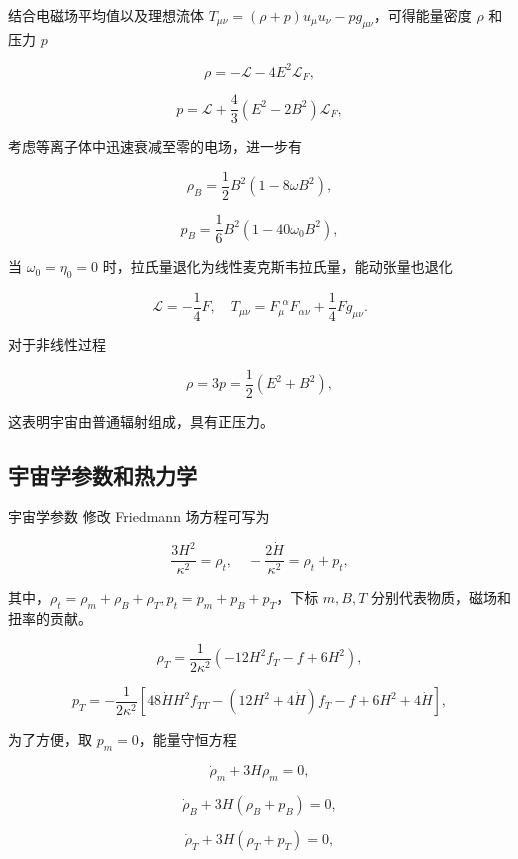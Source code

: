 \documentclass[9pt, dvipsnames]{beamer} %
\begin{document}
\begin{frame}
    结合电磁场平均值以及理想流体 $T_{\mu\nu}=(\rho+p)u_\mu u_\nu-p g_{\mu\nu}$，可得能量密度 $\rho$ 和压力 $p$

    $$
    \rho = -\mathcal{L} - 4E^2 \mathcal{L}_F,
    $$

    $$
    p = \mathcal{L} + \frac{4 }{3 } \left(E^2-2B^2 \right)\mathcal{L}_F,
    $$

    考虑等离子体中迅速衰减至零的电场，进一步有

    $$
    \rho_B = \frac{1 }{2 } B^2\left(1-8\omega B^2 \right),
    $$


    $$
    p_B = \frac{1 }{6 } B^2 \left(1-40\omega_0 B^2 \right),
    $$

    当 $\omega_0=\eta_0=0$ 时，拉氏量退化为线性麦克斯韦拉氏量，能动张量也退化

    $$
    \mathcal{L} = -\frac{1 }{4 } F,\quad
    T_{\mu\nu} = F_\mu^{~~\alpha} F_{\alpha\nu} + \frac{1 }{4 } F g_{\mu\nu}.
    $$

    对于非线性过程

    $$
    \rho = 3p = \frac{1 }{2 } \left(E^2 + B^2 \right),
    $$

    这表明宇宙由普通辐射组成，具有正压力。

\end{frame}

\subsection{宇宙学参数和热力学}

\begin{frame}{宇宙学参数}
    修改 Friedmann 场方程可写为

    $$
    \frac{3 H^2 }{\kappa^2 } = \rho_t,\quad
    -\frac{2\dot{H} }{\kappa^2 }  = \rho_t + p_t,
    $$
    
    其中，$\rho_t=\rho_m+\rho_B+\rho_T,p_t=p_m+p_B+p_T$，下标 $m,B,T$ 分别代表物质，磁场和扭率的贡献。

    $$
    \rho_T = \frac{1 }{2\kappa^2 } \left(-12 H^2 f_T - f + 6H^2 \right),
    $$

    $$
    p_T = -\frac{1 }{2\kappa^2 } \left[48\dot{H}H^2 f_{TT} - \left(12 H^2 + 4\dot{H} \right) f_T - f + 6 H^2 + 4\dot{H} \right],
    $$

    为了方便，取 $p_m=0$，能量守恒方程

    $$
    \dot{\rho}_m + 3H \rho_m = 0,
    $$

    $$
    \dot{\rho}_B + 3H\left(\rho_B + p_B \right) = 0,
    $$

    $$
    \dot{\rho}_T + 3H\left(\rho_T + p_T \right) = 0,
    $$

\end{frame}
\end{document}
